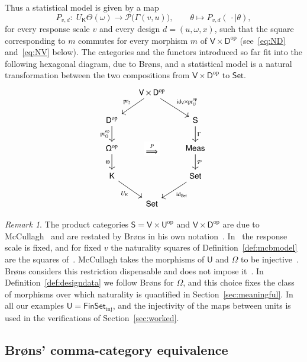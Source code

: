 \documentclass[11pt,a4paper]{article}
\theoremstyle{plain}
\theoremstyle{definition}
\theoremstyle{remark}
\newtheorem{remark}[theorem]{Remark}
\newcommand{\cat}[1]{\mathsf{#1}}
\newcommand{\catU}{\cat{U}}
\newcommand{\catV}{\cat{V}}
\newcommand{\catO}{\cat{\Omega}}
\newcommand{\catS}{\cat{S}}
\newcommand{\catD}{\cat{D}}
\newcommand{\catK}{\cat{K}}
\newcommand{\Meas}{\cat{Meas}}
\newcommand{\Set}{\cat{Set}}
\newcommand{\FinSet}{\cat{FinSet}}
\newcommand{\Prb}{\mathcal{P}}
\newcommand{\op}{\mathrm{op}}
\newcommand{\id}{\mathrm{id}}
\newcommand{\pr}{\mathrm{pr}}
\begin{document}
Thus a statistical model is given by a map
\[
P_{v,d} \colon \; U_\catK\Theta(\omega) \longrightarrow \Prb\bigl(\Gamma(v,u)\bigr),
\qquad \theta \longmapsto P_{v,d}(\,\cdot \mid \theta),
\]
for every response scale $v$ and every design $d = (u,\omega,x)$, such that the
square corresponding to $m$ commutes for every morphism $m$ of
$\catV \times \catD^{\op}$ (see~\eqref{eq:ND} and~\eqref{eq:NV} below). The
categories and the functors introduced so far fit into the following hexagonal
diagram, due to Br\o ns, and a statistical model is a natural transformation
between the two compositions from $\catV \times \catD^{\op}$ to $\Set$.
\[
\begin{tikzcd}[column sep=1.6em, row sep=1.9em]
& \catV \times \catD^{\op}
\arrow[dl, "\pr_2"'] \arrow[dr, "\id_\catV \times \pr_\catU^{\op}"] & \\
\catD^{\op} \arrow[d, "\pr_\catO^{\op}"'] & & \catS \arrow[d, "\Gamma"] \\
\catO^{\op} \arrow[d, "\Theta"'] \arrow[rr, phantom, "\overset{P}{\Longrightarrow}" description] & & \Meas \arrow[d, "\Prb"] \\
\catK \arrow[dr, "U_\catK"']
& & \Set \arrow[dl, "\id_{\Set}"]\\
&\Set
\end{tikzcd}
\]

\begin{remark}\label{rem:attribution}
The product categories $\catS = \catV \times \catU^{\op}$ and
$\catV \times \catD^{\op}$ are due to
McCullagh~\cite[\S4.7, p.~1240]{mccullagh_what_2002} and are restated by
Br\o ns in his own notation~\cite[p.~1280]{brons_discussion_2002}.
In~\cite[\S4.2]{mccullagh_what_2002} the response scale is fixed, and for fixed
$v$ the naturality squares of Definition~\ref{def:mcbmodel} are the squares
of~\cite[p.~1236]{mccullagh_what_2002}. McCullagh takes the morphisms of
$\catU$ and $\catO$ to be injective~\cite[\S4.1]{mccullagh_what_2002}. Br\o ns
considers this restriction dispensable and does not impose
it~\cite[p.~1281]{brons_discussion_2002}. In
Definition~\ref{def:designdata} we follow Br\o ns for $\catO$, and this choice
fixes the class of morphisms over which naturality is quantified in
Section~\ref{sec:meaningful}. In all our examples
$\catU = \FinSet_{\mathrm{inj}}$, and the injectivity of the maps between units
is used in the verifications of Section~\ref{sec:worked}.
\end{remark}

\subsection{Br\o ns' comma-category equivalence}
\end{document}

